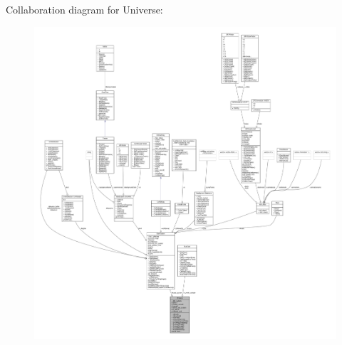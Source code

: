 Collaboration diagram for Universe\+:
\nopagebreak
\begin{figure}[H]
\begin{center}
\leavevmode
\includegraphics[width=350pt]{df/d1d/classUniverse__coll__graph}
\end{center}
\end{figure}
